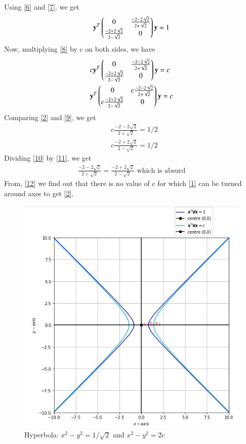 \documentclass[journal,12pt,twocolumn]{IEEEtran}
\begin{document}
Using \eqref{6} and \eqref{7}, we get
\begin{align}
	\mathbf{y}^T\begin{pmatrix}0 & \frac{-2-2\sqrt{2}}{2 + \sqrt{2}} \\ \frac{-2 + 2\sqrt{2}}{2-\sqrt{2}} & 0 \end{pmatrix}\mathbf{y} = 1 \label{8}
\end{align}
Now, multiplying \eqref{8} by c on both sides, we have
\begin{align}
&	c\mathbf{y}^T\begin{pmatrix}0 & \frac{-2-2\sqrt{2}}{2 + \sqrt{2}} \\ \frac{-2 + 2\sqrt{2}}{2-\sqrt{2}}   &0\end{pmatrix}\mathbf{y} = c \\
&\mathbf{y}^T\begin{pmatrix}0 & c\frac{-2-2\sqrt{2}}{2 + \sqrt{2}} \\ c\frac{-2 + 2\sqrt{2}}{2-\sqrt{2}} &0\end{pmatrix}\mathbf{y} = c \label{9}
\end{align} 
Comparing \eqref{2} and \eqref{9}, we get
\begin{align}
 & c\frac{-2-2\sqrt{2}}{2 + \sqrt{2}} = 1/2 \label{10} \\
 & c\frac{-2 + 2\sqrt{2}}{2-\sqrt{2}} = 1/2 \label{11}	
\end{align}
Dividing  \eqref{10} by  \eqref{11}, we get
\begin{align}
	\frac{-2-2\sqrt{2}}{2 + \sqrt{2}} = \frac{-2 + 2\sqrt{2}}{2-\sqrt{2}} \text{ which is absurd} \label{12} 
\end{align}
From, \eqref{12} we find out that there is no value of c for which \eqref{1} can be turned around axes to get \eqref{2}. 
\begin{figure}[!htb]

	\includegraphics[width=\columnwidth]{Assignment5.jpg}
	
	\caption{Hyperbola: $x^2-y^2=1/\sqrt{2}$ and $x^2 - y^2=2c$}
	
	\label{fig:1}
	
\end{figure}
\end{document}

